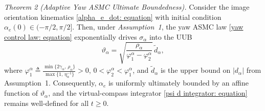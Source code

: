\textit{Theorem 2 (Adaptive Yaw ASMC Ultimate Boundedness).}
Consider the image orientation kinematics \eqref{alpha_e_dot: equation} with initial condition $\alpha_e(0)\in(-\pi/2,\pi/2]$. Then, under \textit{Assumption~1}, the yaw ASMC law \eqref{yaw control law: equation} exponentially drives $\sigma_\alpha$ into the UUB
\begin{equation} \label{yaw UUB bound: equation}
    \vartheta_\alpha = \sqrt{\frac{\rho_\alpha}{\varphi_1^\alpha-\varphi_2^\alpha}}\,\tilde{d}_\alpha,
\end{equation}
where $\varphi_1^\alpha \triangleq \frac{\min\{2\gamma_\alpha,\,\rho_\alpha\}}{\max\{1,\,\eta_\alpha^{-1}\}}>0$, $0<\varphi_2^\alpha<\varphi_1^\alpha$, and $\tilde{d}_\alpha$ is the upper bound on $|d_\alpha|$ from Assumption~1. Consequently, $\alpha_e$ is uniformly ultimately bounded by an affine function of $\vartheta_\alpha$, and the virtual-compass integrator \eqref{psi d integrator: equation} remains well-defined for all $t\ge 0$.

